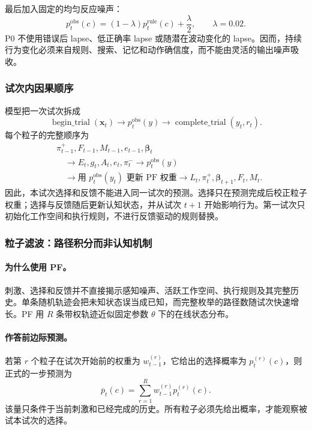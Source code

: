 最后加入固定的均匀反应噪声：
\begin{equation}
p_t^{\mathrm{obs}}(c)
=(1-\lambda)p_t^{\mathrm{rule}}(c)+\frac{\lambda}{2},
\qquad \lambda=0.02.
\label{eq:m0815-output-lapse}
\end{equation}
P0 不使用错误后 lapse、低正确率 lapse 或随潜在波动变化的 lapse。因而，持续行为变化必须来自规则、搜索、记忆和动作确信度，而不能由灵活的输出噪声吸收。


\subsubsection{试次内因果顺序}

模型把一次试次拆成
\begin{equation}
\operatorname{begin\_trial}(\mathbf x_t)
\longrightarrow p_t^{\mathrm{obs}}(y)
\longrightarrow
\operatorname{complete\_trial}(y_t,r_t).
\label{eq:m0815-lifecycle}
\end{equation}
每个粒子的完整顺序为
\begin{equation}
\begin{aligned}
&\pi_{t-1}^{+},F_{t-1},M_{t-1},e_{t-1},\boldsymbol\beta_t
\\
&\quad\longrightarrow
E_t,g_t,A_t,e_t,\pi_t^{-}
\longrightarrow p_t^{\mathrm{obs}}(y)
\\
&\quad\longrightarrow
\text{用 }p_t^{\mathrm{obs}}(y_t)\text{ 更新 PF 权重}
\longrightarrow L_t,\pi_t^{+},\boldsymbol\beta_{t+1},F_t,M_t.
\end{aligned}
\label{eq:m0815-causal-order}
\end{equation}
因此，本试次选择和反馈不能进入同一试次的预测。选择只在预测完成后校正粒子权重；选择与反馈随后更新认知状态，并从试次 $t+1$ 开始影响行为。第一试次只初始化工作空间和执行规则，不进行反馈驱动的规则替换。


\subsubsection{粒子滤波：路径积分而非认知机制}

\paragraph{为什么使用 PF。}
刺激、选择和反馈并不直接揭示感知噪声、活跃工作空间、执行规则及其完整历史。单条随机轨迹会把未知状态误当成已知，而完整枚举的路径数随试次快速增长。PF 用 $R$ 条带权轨迹近似固定参数 $\theta$ 下的在线状态分布。

\paragraph{作答前边际预测。}
若第 $r$ 个粒子在试次开始前的权重为 $w_{t-1}^{(r)}$，它给出的选择概率为 $p_t^{(r)}(c)$，则正式的一步预测为
\begin{equation}
\overline p_t(c)
=\sum_{r=1}^{R}w_{t-1}^{(r)}p_t^{(r)}(c).
\label{eq:m0815-pf-marginal}
\end{equation}
该量只条件于当前刺激和已经完成的历史。所有粒子必须先给出概率，才能观察被试本试次的选择。

